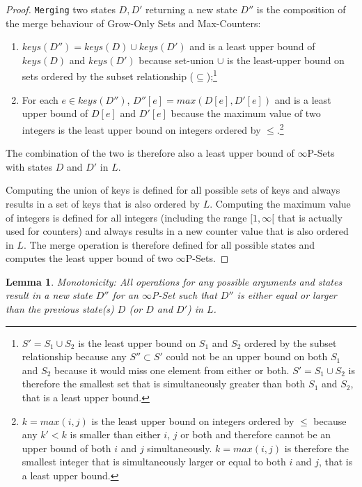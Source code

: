 \documentclass[11pt, oneside]{article}   	%
\newtheorem{lemma}{Lemma}
\begin{document}
\begin{proof}
\texttt{Merging} two states $D, D'$ returning a new state $D''$ is the composition of the merge behaviour of Grow-Only Sets and Max-Counters: 
\begin{enumerate}
  \item $\textit{keys}(D'')=\textit{keys}(D) \cup keys(D')$ and is a least upper bound of $\textit{keys}(D)$ and $\textit{keys}(D')$ because set-union $\cup$ is the least-upper bound on sets ordered by the subset relationship ($\subseteq$);\footnote{$S'=S_1 \cup S_2$ is the least upper bound on $S_1$ and $S_2$ ordered by the subset relationship because any $S'' \subset S'$ could not be an upper bound on both $S_1$ and $S_2$ because it would miss one element from either or both. $S'=S_1 \cup S_2$ is therefore the smallest set that is simultaneously greater than both $S_1$ and $S_2$, that is a least upper bound.}
  \item For each $e \in \textit{keys}(D'')$, $D''[e]=\textit{max}(D[e], D'[e])$ and is a least upper bound of $D[e]$ and $D'[e]$ because the maximum value of two integers is the least upper bound on integers ordered by $\leq$.\footnote{$k=\textit{max}(i,j)$ is the least upper bound on integers ordered by $\leq$ because any $k' < k$ is smaller than either $i$, $j$ or both and therefore cannot be an upper bound of both $i$ and $j$ simultaneously. $k=\textit{max}(i,j)$ is therefore the smallest integer that is simultaneously larger or equal to both $i$ and $j$, that is a least upper bound.}  
 \end{enumerate} 
  The combination of the two is therefore also a least upper bound of $\infty$P-Sets with states $D$ and $D'$ in $L$. 

Computing the union of keys is defined for all possible sets of keys and always results in a set of keys that is also ordered by $L$. Computing the maximum value of integers is defined for all integers (including the range $[1, \infty[$  that is actually used for counters) and always results in a new counter value that is also ordered in $L$. The merge operation is therefore defined for all possible states and computes the least upper bound of two $\infty$P-Sets.
\end{proof}

\begin{lemma}
\textit{Monotonicity}: All operations for any possible arguments and states result in a new state $D''$ for an  $\infty$P-Set such that $D''$ is either equal or larger than the previous state(s) $D$ (or $D$ and $D'$) in $L$.
\end{lemma}
\end{document}

